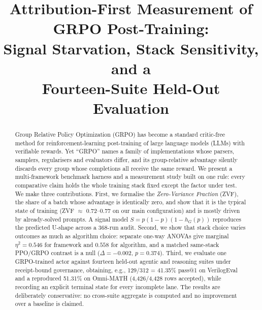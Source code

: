 \documentclass[conference]{IEEEtran}
\begin{document}
\title{Attribution-First Measurement of GRPO Post-Training:\\
Signal Starvation, Stack Sensitivity, and a\\
Fourteen-Suite Held-Out Evaluation}

\author{
\and
{}
}

\maketitle

\begin{abstract}
Group Relative Policy Optimization (GRPO) has become a standard critic-free
method for reinforcement-learning post-training of large language models
(LLMs) with verifiable rewards. Yet ``GRPO'' names a family of
implementations whose parsers, samplers, regularisers and evaluators differ,
and its group-relative advantage silently discards every group whose
completions all receive the same reward. We present a multi-framework
benchmark harness and a measurement study built on one rule: every
comparative claim holds the whole training stack fixed except the factor
under test. We make three contributions. First, we formalise the
\emph{Zero-Variance Fraction} (ZVF), the share of a batch whose advantage is
identically zero, and show that it is the typical state of training
(ZVF $\approx$ 0.72--0.77 on our main configuration) and is mostly driven by
already-solved prompts. A signal model $S = p(1-p)(1-h_G(p))$ reproduces the
predicted U-shape across a 368-run audit. Second, we show that stack choice
varies outcomes as much as algorithm choice: separate one-way ANOVAs give
marginal $\eta^2 = 0.546$ for framework and $0.558$ for algorithm, and a
matched same-stack PPO/GRPO contrast is a null ($\Delta = -0.002$,
$p = 0.374$).
Third, we evaluate one GRPO-trained actor against fourteen held-out agentic
and reasoning suites under receipt-bound governance, obtaining, e.g.,
129/312 = 41.35\% pass@1 on VerilogEval and a reproduced 51.31\% on
Omni-MATH (4,426/4,428 rows accepted), while recording an explicit terminal
state for every incomplete lane. The results are deliberately conservative: no cross-suite aggregate is
computed and no improvement over a baseline is claimed.
\end{abstract}
\end{document}

